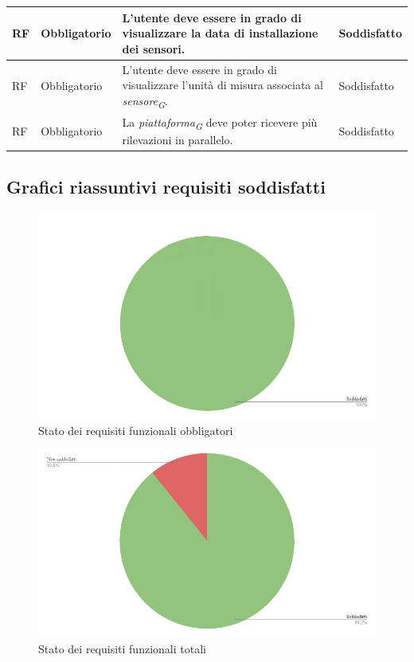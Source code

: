 \begin{longtable}{|C{1.5cm}|C{2cm}|L{5cm}|C{2cm}|}
    \hline
     RF & Obbligatorio & L'utente deve essere in grado di visualizzare la data di installazione dei sensori.& Soddisfatto \\

    \hline
     RF & Obbligatorio & L'utente deve essere in grado di visualizzare l'unità di misura associata al \textit{sensore}\textsubscript{\textit{G}}.& Soddisfatto \\
    
    \hline
     RF & Obbligatorio & La \textit{piattaforma}\textsubscript{\textit{G}} deve poter ricevere più rilevazioni in parallelo. & Soddisfatto \\

    \hline
    
\end{longtable}

\subsection{Grafici riassuntivi requisiti soddisfatti}

\begin{figure}[H]
    \centering
    \includegraphics[width=1\textwidth]{../Images/SpecificaTecnica/req_obbligatori.PNG}
    \caption{Stato dei requisiti funzionali obbligatori}
    \label{fig: reqob}
\end{figure}

\begin{figure}[H]
    \centering
    \includegraphics[width=1\textwidth]{../Images/SpecificaTecnica/reqfunz.jpg}
    \caption{Stato dei requisiti funzionali totali}
    \label{fig: reqtot}
\end{figure}